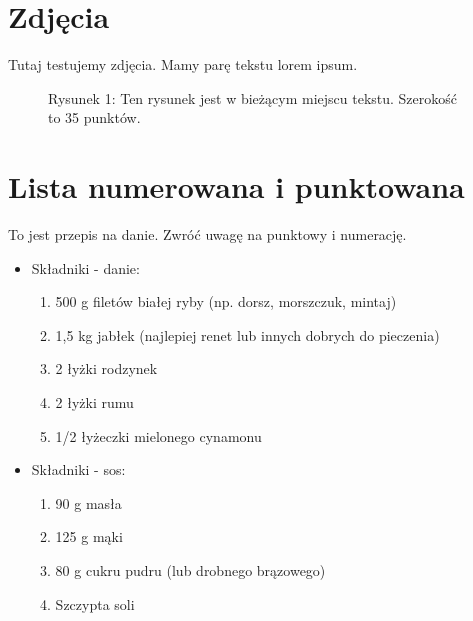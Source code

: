 \section{Zdjęcia}
Tutaj testujemy zdjęcia. Mamy parę tekstu lorem ipsum.
\begin{figure}[h]
    \centering
    \caption{Rysunek 1: Ten rysunek jest w bieżącym miejscu tekstu. Szerokość to 35 punktów.}
    \label{fig:rys1}
\end{figure}

\section{Lista numerowana i punktowana}
To jest przepis na danie. Zwróć uwagę na punktowy i numerację.

\begin{itemize}
    \item {Składniki - danie:}
    \begin{enumerate}[label={\arabic*\textendash}, align=right]
        \item 500 g filetów białej ryby (np. dorsz, morszczuk, mintaj)
        \item 1,5 kg jabłek (najlepiej renet lub innych dobrych do pieczenia)
        \item 2 łyżki rodzynek
        \item 2 łyżki rumu
        \item 1/2 łyżeczki mielonego cynamonu
    \end{enumerate}
    \end{itemize}
\begin{itemize}
    \item {Składniki - sos:}
    \begin{enumerate}[label=\Alph*:]
        \item 90 g masła
        \item 125 g mąki
        \item 80 g cukru pudru (lub drobnego brązowego)
        \item Szczypta soli
    \end{enumerate}
    \end{itemize}
